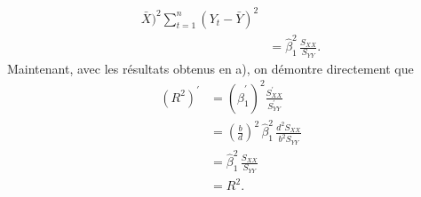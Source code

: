 \begin{solution}{2.9}
\begin{enumerate}
\begin{align*}
{          \bar{X})^2}{\sum_{t=1}^n (Y_t - \bar{Y})^2} \\
        &= \hat{\beta}_1^2\, \frac{S_{XX}}{S_{YY}}.
      \end{align*}
      Maintenant, avec les résultats obtenus en a), on démontre
      directement que
      \begin{align*}
        (R^2)^\prime
        &= (\hat{\beta}_1^\prime)^2 \frac{S_{XX}^\prime}{S_{YY}^\prime} \\
        &=
        \left(
          \frac{b}{d}
        \right)^2\,
        \hat{\beta}_1^2\, \frac{d^2 S_{XX}}{b^2 S_{YY}} \\
        &= \hat{\beta}_1^2\, \frac{S_{XX}}{S_{YY}} \\
        &= R^2.
      \end{align*}
    \end{enumerate}
  
\end{solution}
